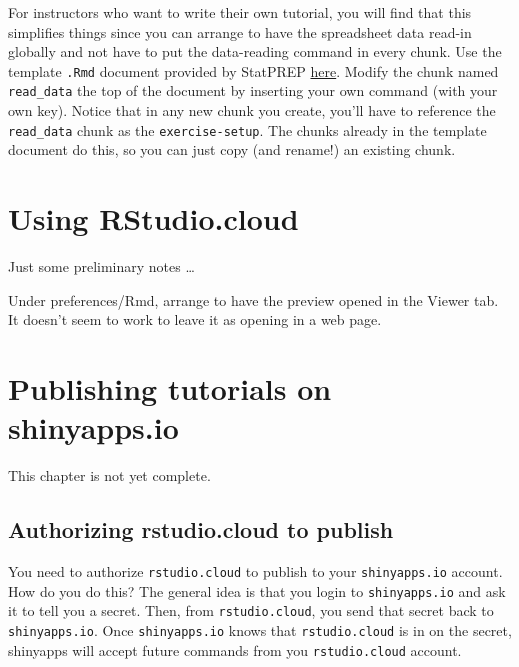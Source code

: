 \documentclass[]{book}
\theoremstyle{definition}
\theoremstyle{definition}
\theoremstyle{definition}
\theoremstyle{remark}
\begin{document}
For instructors who want to write their own tutorial, you will find that
this simplifies things since you can arrange to have the spreadsheet
data read-in globally and not have to put the data-reading command in
every chunk. Use the template \texttt{.Rmd} document provided by
StatPREP \href{}{here}. Modify the chunk named \texttt{read\_data} the
top of the document by inserting your own command (with your own key).
Notice that in any new chunk you create, you'll have to reference the
\texttt{read\_data} chunk as the \texttt{exercise-setup}. The chunks
already in the template document do this, so you can just copy (and
rename!) an existing chunk.

\chapter{Using RStudio.cloud}\label{using-rstudio.cloud}

Just some preliminary notes \ldots{}

Under preferences/Rmd, arrange to have the preview opened in the Viewer
tab. It doesn't seem to work to leave it as opening in a web page.

\chapter{Publishing tutorials on
shinyapps.io}\label{publishing-tutorials-on-shinyapps.io}

This chapter is not yet complete.

\section{Authorizing rstudio.cloud to
publish}\label{authorizing-rstudio.cloud-to-publish}

You need to authorize \texttt{rstudio.cloud} to publish to your
\texttt{shinyapps.io} account. How do you do this? The general idea is
that you login to \texttt{shinyapps.io} and ask it to tell you a secret.
Then, from \texttt{rstudio.cloud}, you send that secret back to
\texttt{shinyapps.io}. Once \texttt{shinyapps.io} knows that
\texttt{rstudio.cloud} is in on the secret, shinyapps will accept future
commands from you \texttt{rstudio.cloud} account.
\end{document}
